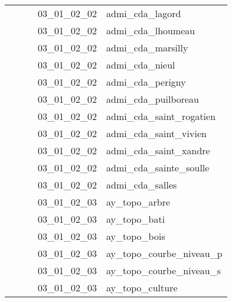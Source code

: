 \documentclass[12pt,titlepage,oneside]{book}
\begin{document}
\begin{supertabular}{|p{7.5cm}|p{7.5cm}|p{7.5cm}|c|p{10cm}|}
                   &                    &                    & 03\_01\_02\_02 & admi\_cda\_lagord\\
                   &                    &                    & 03\_01\_02\_02 & admi\_cda\_lhoumeau\\
                   &                    &                    & 03\_01\_02\_02 & admi\_cda\_marsilly\\
                   &                    &                    & 03\_01\_02\_02 & admi\_cda\_nieul\\
                   &                    &                    & 03\_01\_02\_02 & admi\_cda\_perigny\\
                   &                    &                    & 03\_01\_02\_02 & admi\_cda\_puilboreau\\
                   &                    &                    & 03\_01\_02\_02 & admi\_cda\_saint\_rogatien\\
                   &                    &                    & 03\_01\_02\_02 & admi\_cda\_saint\_vivien\\
                   &                    &                    & 03\_01\_02\_02 & admi\_cda\_saint\_xandre\\
                   &                    &                    & 03\_01\_02\_02 & admi\_cda\_sainte\_soulle\\
                   &                    &                    & 03\_01\_02\_02 & admi\_cda\_salles\\
                   &                    &                    & 03\_01\_02\_03 & ay\_topo\_arbre\\
                   &                    &                    & 03\_01\_02\_03 & ay\_topo\_bati\\
                   &                    &                    & 03\_01\_02\_03 & ay\_topo\_bois\\
                   &                    &                    & 03\_01\_02\_03 & ay\_topo\_courbe\_niveau\_p\\
                   &                    &                    & 03\_01\_02\_03 & ay\_topo\_courbe\_niveau\_s\\
                   &                    &                    & 03\_01\_02\_03 & ay\_topo\_culture\\

\end{supertabular}
\end{document}
